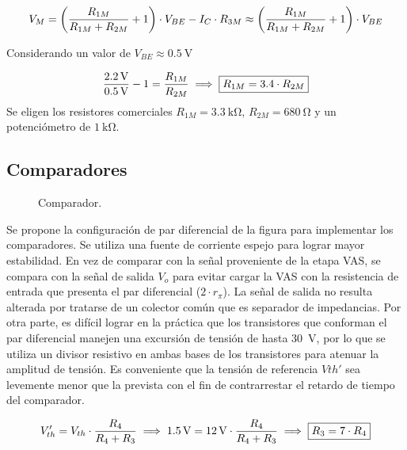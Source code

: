 	\begin{equation}
		\centering
		V_M = \left( \frac{R_{1M}}{R_{1M} + R_{2M}} +1 \right) \cdot V_{BE} - I_C \cdot R_{3M} \approx  \left( \frac{R_{1M}}{R_{1M} + R_{2M}} +1 \right) \cdot V_{BE}
	\end{equation}

	 Considerando un valor de $V_{BE} \approx \SI{0.5}{\volt}$

	 \begin{equation}
	 	\centering
		\frac{\SI{2.2}{\volt}}{\SI{0.5}{\volt}} -1 = \frac{R_{1M}}{R_{2M}} \implies \boxed{R_{1M} = \num{3,4} \cdot R_{2M}}
	\end{equation}
	Se eligen los resistores comerciales $R_{1M} = \SI{3.3}{\kilo\ohm}$, $R_{2M} = \SI{680}{\ohm}$ y un potenciómetro de $\SI{1}{\kilo\ohm}$. 


\subsection{Comparadores}

	\begin{figure}[H]
		\centering
		\scalebox{0.5}{}
		\caption{Comparador.}
		\label{fig.comparador}
	\end{figure}

	Se propone la configuración de par diferencial de la figura para implementar los comparadores. Se utiliza una fuente de corriente espejo para lograr mayor estabilidad. En vez de comparar con la señal proveniente de la etapa VAS, se compara con la señal de salida $V_{o}$ para evitar cargar la VAS con la resistencia de entrada que presenta el par diferencial ($2\cdot r_\pi$). La señal de salida no resulta alterada por tratarse de un colector común que es separador de impedancias.
	Por otra parte, es difícil lograr en la práctica que los transistores que conforman el par diferencial manejen una excursión de tensión de hasta \SI{30}{\volt}, por lo que se utiliza un divisor resistivo en ambas bases de los transistores para atenuar la amplitud de tensión. Es conveniente que la tensión de referencia $Vth'$ sea levemente menor que la prevista con el fin de contrarrestar el retardo de tiempo del comparador.

\begin{equation}
	\centering
	V_{th}' = V_{th} \cdot \frac{R_4}{R_4 + R_3} \implies \SI{1.5}{\volt} = \SI{12}{\volt} \cdot \frac{R_4}{R_4 + R_3} \implies \boxed{R_3 = 7 \cdot R_4}
\end{equation}

